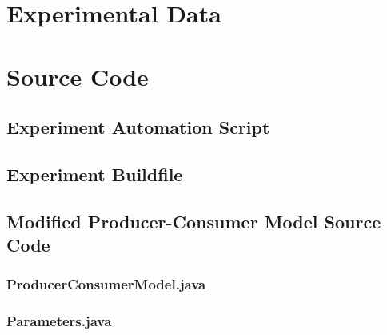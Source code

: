 \documentclass[12pt,a4paper]{article}
\begin{document}
  	\appendix

		\section{Experimental Data}
		\label{appendix:data}

			\centerline{}
			\pagebreak
  
		\section{Source Code}

			\subsection{Experiment Automation Script}
			\label{appendix:experimentsource}

				

			\subsection{Experiment Buildfile}
			\label{appendix:buildfile}

				

			\subsection{Modified Producer-Consumer Model Source Code}
			\label{appendix:modelsource}
			
				\subsubsection{ProducerConsumerModel.java}

					

				\subsubsection{Parameters.java}

					
\end{document}
